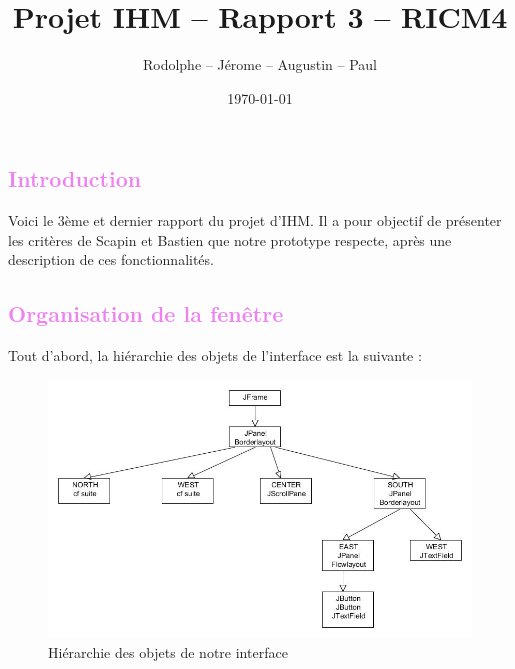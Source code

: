 \documentclass[12pt, a4paper]{article}
\title{Projet IHM -- Rapport 3 -- RICM4}
\author{\bsc{Fréby} Rodolphe -- \bsc{Barbier} Jérome -- \bsc{Husson} Augustin -- \bsc{Labat} Paul}
\date{\today}
\begin{document}
\maketitle
\tableofcontents
\newpage

\textcolor{Violet}{\section{Introduction}}
Voici le 3ème et dernier rapport du projet d'IHM. Il a pour objectif de présenter les critères de Scapin et Bastien que notre prototype respecte, après une description de ces fonctionnalités.

\textcolor{Violet}{\section{Organisation de la fenêtre}}

Tout d'abord, la hiérarchie des objets de l'interface est la suivante :

\begin{figure}[h]
\begin{center}
   \includegraphics[scale = 0.65]{arbre_jframe.jpg}
	\caption{Hiérarchie des objets de notre interface}
	\end{center}
\end{figure}
\end{document}
